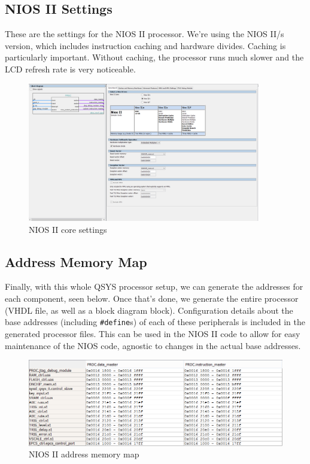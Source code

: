 \subsection{NIOS II Settings}

These are the settings for the NIOS II processor. We're using the NIOS II/s version, which includes instruction caching and hardware divides. Caching is particularly important. Without caching, the processor runs much slower and the LCD refresh rate is very noticeable.

\begin{figure}[ht!]
    \centering
    \includegraphics[width=4in]{fpga_logic/proc_settings.png}
		\caption{NIOS II core settings}
\end{figure}

\subsection{Address Memory Map}

Finally, with this whole QSYS processor setup, we can generate the addresses for each component, seen below. Once that's done, we generate the entire processor (VHDL file, as well as a block diagram block). Configuration details about the base addresses (including \verb=#define=s) of each of these peripherals is included in the generated processor files. This can be used in the NIOS II code to allow for easy maintenance of the NIOS code, agnostic to changes in the actual base addresses.

\begin{figure}[ht!]
    \centering
    \includegraphics[width=6in]{fpga_logic/address_map.png}
		\caption{NIOS II address memory map}
\end{figure}
